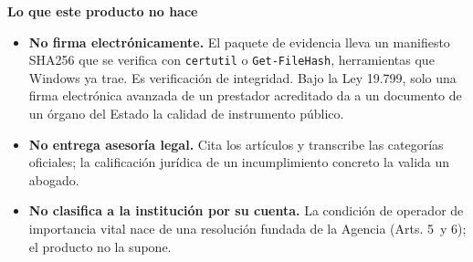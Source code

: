 \documentclass[10pt,a4paper]{article}
\begin{document}
\vspace{-4pt}

\begin{tcolorbox}[colback=fondo,colframe=azul,boxrule=0.6pt,arc=2pt,left=6pt,right=6pt,
top=5pt,bottom=5pt]
{\bfseries\color{azul}Lo que este producto no hace}

\begin{itemize}
\item \textbf{No firma electrónicamente.} El paquete de evidencia lleva un manifiesto
SHA256 que se verifica con \texttt{certutil} o \texttt{Get-FileHash}, herramientas que
Windows ya trae. Es verificación de integridad. Bajo la Ley 19.799, solo una firma
electrónica avanzada de un prestador acreditado da a un documento de un órgano del Estado
la calidad de instrumento público.
\item \textbf{No entrega asesoría legal.} Cita los artículos y transcribe las categorías
oficiales; la calificación jurídica de un incumplimiento concreto la valida un abogado.
\item \textbf{No clasifica a la institución por su cuenta.} La condición de operador de
importancia vital nace de una resolución fundada de la Agencia (Arts. 5\textdegree\ y
6\textdegree); el producto no la supone.
\end{itemize}
\end{tcolorbox}

\vspace{2pt}
\end{document}
